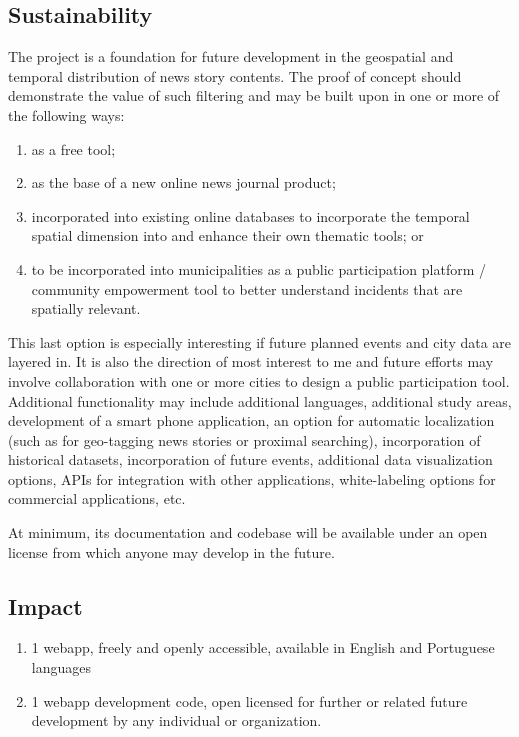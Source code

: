 \subsection{Sustainability}
The project is a foundation for future development in the geospatial and temporal distribution of news story contents.  The proof of concept should demonstrate the value of such filtering and may be built upon in one or more of the following ways: 
\begin{enumerate}
	\item as a free tool; 
	\item as the base of a new online news journal product;
	\item incorporated into existing online databases to incorporate the temporal spatial dimension into and enhance their own thematic tools; or 
	\item to be incorporated into municipalities as a public participation platform / community empowerment tool to better understand incidents that are spatially relevant. 
\end{enumerate}

This last option is especially interesting if future planned events and city data are layered in. It is also the direction of most interest to me and future efforts may involve collaboration with one or more cities to design a public participation tool. Additional functionality may include additional languages, additional study areas, development of a smart phone application, an option for automatic localization (such as for geo-tagging news stories or proximal searching), incorporation of historical datasets, incorporation of future events, additional data visualization options, APIs for integration with other applications, white-labeling options for commercial applications, etc.

At minimum, its documentation and codebase will be available under an open license from which anyone may develop in the future.

\subsection{Impact}
\begin{enumerate}
	\item 1 webapp, freely and openly accessible, available in English and Portuguese languages
	\item 1 webapp development code, open licensed for further or related future development by any individual or organization.
\end{enumerate}
